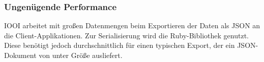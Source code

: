 \subsubsection{Ungenügende Performance}
\label{sssec:epv-ungenuegende-performance}

IOOI arbeitet mit großen Datenmengen beim Exportieren der Daten als JSON an die
Client-Applikationen.  Zur Serialisierung wird die Ruby-Bibliothek
 \cite{ams} genutzt.  Diese benötigt jedoch
durchschnittlich  für einen typischen Export, der ein JSON-Dokument von
unter  Größe ausliefert.

